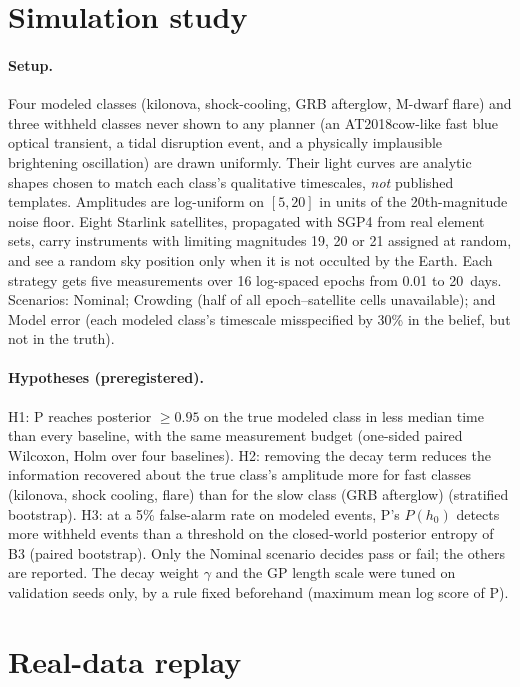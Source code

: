 \documentclass[10pt,twocolumn]{article}
\begin{document}
\section{Simulation study}\label{sec:sim}
\paragraph{Setup.} Four modeled classes (kilonova, shock-cooling, GRB afterglow, M-dwarf flare) and three withheld classes never shown to any planner (an AT2018cow-like fast blue optical transient, a tidal disruption event, and a physically implausible brightening oscillation) are drawn uniformly. Their light curves are analytic shapes chosen to match each class's qualitative timescales, \emph{not} published templates. Amplitudes are log-uniform on $[5,20]$ in units of the 20th-magnitude noise floor. Eight Starlink satellites, propagated with SGP4 from real element sets, carry instruments with limiting magnitudes 19, 20 or 21 assigned at random, and see a random sky position only when it is not occulted by the Earth. Each strategy gets five measurements over 16 log-spaced epochs from 0.01 to 20~days. Scenarios: Nominal; Crowding (half of all epoch--satellite cells unavailable); and Model error (each modeled class's timescale misspecified by 30\% in the belief, but not in the truth).

\paragraph{Hypotheses (preregistered).} H1: P reaches posterior $\geq 0.95$ on the true modeled class in less median time than every baseline, with the same measurement budget (one-sided paired Wilcoxon, Holm over four baselines). H2: removing the decay term reduces the information recovered about the true class's amplitude more for fast classes (kilonova, shock cooling, flare) than for the slow class (GRB afterglow) (stratified bootstrap). H3: at a 5\% false-alarm rate on modeled events, P's $P(h_0)$ detects more withheld events than a threshold on the closed-world posterior entropy of B3 (paired bootstrap). Only the Nominal scenario decides pass or fail; the others are reported. The decay weight $\gamma$ and the GP length scale were tuned on validation seeds only, by a rule fixed beforehand (maximum mean log score of P).



\section{Real-data replay}\label{sec:real}
\end{document}
